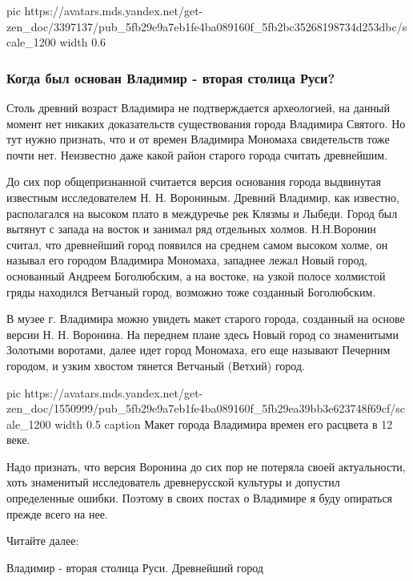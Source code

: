 \ifcmt
  pic https://avatars.mds.yandex.net/get-zen_doc/3397137/pub_5fb29e9a7eb1fe4ba089160f_5fb2bc35268198734d253dbc/scale_1200
  width 0.6
\fi

\subsubsection{Когда был основан Владимир - вторая столица Руси?}

Столь древний возраст Владимира не подтверждается археологией, на данный
момент нет никаких доказательств существования города Владимира Святого.
Но тут нужно признать, что и от времен Владимира Мономаха свидетельств
тоже почти нет. Неизвестно даже какой район старого города считать
древнейшим.

До сих пор общепризнанной считается версия основания города выдвинутая
известным исследователем Н. Н. Ворониным. Древний Владимир, как известно,
располагался на высоком плато в междуречье рек Клязмы и Лыбеди. Город был
вытянут с запада на восток и занимал ряд отдельных холмов. Н.Н.Воронин
считал, что древнейший город появился на среднем самом высоком холме, он
называл его городом Владимира Мономаха, западнее лежал Новый город,
основанный Андреем Боголюбским, а на востоке, на узкой полосе холмистой
гряды находился Ветчаный город, возможно тоже созданный Боголюбским.

В музее г. Владимира можно увидеть макет старого города, созданный на
основе версии Н. Н. Воронина. На переднем плане здесь Новый город со
знаменитыми Золотыми воротами, далее идет город Мономаха, его еще называют
Печерним городом, и узким хвостом тянется Ветчаный (Ветхий) город.

\ifcmt
  pic https://avatars.mds.yandex.net/get-zen_doc/1550999/pub_5fb29e9a7eb1fe4ba089160f_5fb29ea39bb3e623748f69cf/scale_1200
  width 0.5
	caption Макет города Владимира времен его расцвета в 12 веке.
\fi

Надо признать, что версия Воронина до сих пор не потеряла своей
актуальности, хоть знаменитый исследователь древнерусской культуры и
допустил определенные ошибки. Поэтому в своих постах о Владимире я буду
опираться прежде всего на нее.

Читайте далее:

Владимир - вторая столица Руси. Древнейший город
